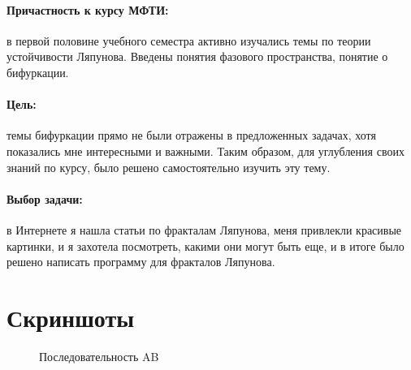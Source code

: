 \documentclass[a5paper,10pt, twoside]{article} %
\begin{document}
    \paragraph{Причастность к курсу МФТИ: }

    в первой половине учебного семестра активно изучались темы по теории устойчивости Ляпунова.
    Введены понятия фазового пространства, понятие о бифуркации. 

    \paragraph{Цель: }
    темы бифуркации прямо не были отражены в предложенных задачах, хотя показались мне 
    интересными и важными. Таким образом, для углубления своих знаний по курсу, было решено 
    самостоятельно изучить эту тему.
    
    \paragraph{Выбор задачи: }
    в Интернете я нашла статьи по фракталам Ляпунова, меня привлекли красивые картинки, и я 
    захотела посмотреть, какими они могут быть еще, и в итоге было решено написать программу 
    для фракталов Ляпунова.

\section{Скриншоты}

\newpage

  \begin{center}
    \begin{figure}[h!]
        \caption{Последовательность AB}
    \end{figure}
  \end{center}
\end{document}
